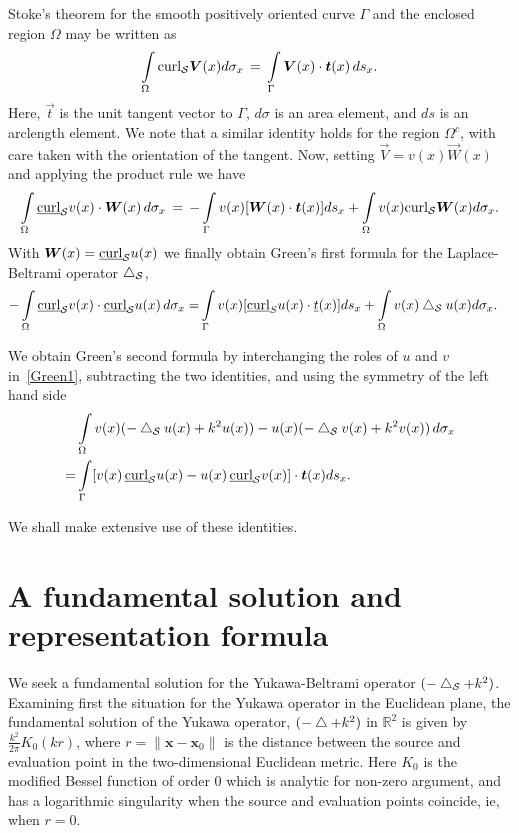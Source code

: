 Stoke's theorem for the  smooth positively oriented curve $\Gamma$ and
the enclosed region $\Omega$ may be written  as
\begin{align*}
  \int\limits_{\Omega} \mbox{curl}_{\S} \vec{V}(x) d\sigma_x \, = \,
  \int\limits_\Gamma \vec{V}(x) \cdot \vec{t}(x) \, ds_x .
\end{align*}
Here, $\vec{t}$ is the unit tangent vector to $\Gamma$, $d\sigma$ is an
area element, and $ds$ is an arclength element. We note that a similar
identity holds for the region $\Omega^{c}$, with care taken with the
orientation of the tangent.  Now, setting $\vec{V} = v(x) \vec{W}(x)$
and applying the product rule we have
\begin{align*}
  \int\limits_{\Omega} \underline{\mbox{curl}}_{\S} v(x) \cdot
  \vec{W}(x) \, d\sigma_x \, = \, 
  -\int\limits_{\Gamma} v(x) [\vec{W}(x) \cdot \vec{t}(x)] ds_x +
  \int\limits_{\Omega} v(x) \mbox{curl}_{\S} \vec{W}(x) d\sigma_x .
\end{align*}
With $\vec{W}(x) = \underline{\mbox{curl}}_{\S} u(x)$ we finally
obtain Green's first formula for the Laplace-Beltrami operator
$\bigtriangleup_{\mathcal{S}}$,
\begin{align}
  \label{Green1}
  -\int\limits_{\Omega} \underline{\mbox{curl}}_{\mathcal{S}} v(x) \cdot
  \underline{\mbox{curl}}_{\mathcal{S}} u(x) \, d\sigma_x 
  =& \int\limits_{\Gamma} v(x) [\underline{\mbox{curl}}_S u(x) \cdot 
  \underline{t}(x)] ds_x +\int\limits_{\Omega} v(x) \bigtriangleup_{\mathcal{S}}u(x) d\sigma_x.
\end{align}

We obtain Green's second formula by interchanging the roles of $u$ and
$v$ in~\eqref{Green1}, subtracting the two identities, and using the
symmetry of the left hand side
\begin{align}
  &\int\limits_{\Omega} v(x)(-\lap_{\S}u(x) + k^2 u(x))-
  u(x)(-\lap_{\S}v(x) +k^2v(x))\, d\sigma_x \nonumber \\
  =&\int\limits_\Gamma [v(x)\,\underline{\mbox{curl}}_{\S} 
  u(x) - u(x)\, \underline{\mbox{curl}}_{\S}v(x)] \cdot 
  \vec{t}(x) ds_x.
  \label{Green2}
\end{align}

We shall make extensive use of these identities.





\section{A fundamental solution and representation formula}
We seek a fundamental solution for the Yukawa-Beltrami operator
$(-\bigtriangleup_{\mathcal{S}} + k^2)$.  Examining first the situation for the Yukawa
operator in the Euclidean plane, the fundamental solution of the Yukawa
operator, $(-\bigtriangleup + k^2)$ in $\mathbb{R}^2$ is given by
$\frac{k^2}{2\pi} K_{0}(kr)$, where $r=\|\mathbf{x} - \mathbf{x}_{0}\|$
is the distance between the source and evaluation point in the
two-dimensional Euclidean metric. Here $K_{0}$ is the modified Bessel
function of order 0 which is analytic for non-zero argument, and has a
logarithmic singularity when the source and evaluation points coincide,
ie, when $r=0$.


